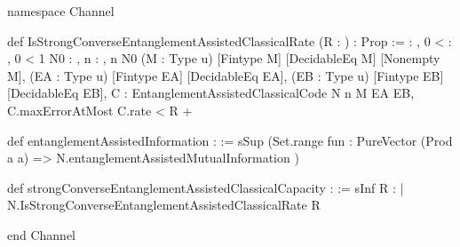 \documentclass[10pt,a4paper]{article}
\newif\ifqitLineFocused
\newcommand{\qitHighlightSpan}[2]{%
	\ifnum\value{lstnumber}<#1\relax
	\else
		\ifnum\value{lstnumber}>#2\relax
		\else
			\qitLineFocusedtrue
		\fi
	\fi
}
\begin{document}
\begin{qitleancode}[title={EA information and strong converse},
qit focus={\qitHighlightSpan{4}{5}\qitHighlightSpan{9}{10}\qitHighlightSpan{16}{17}}]
namespace Channel

def IsStrongConverseEntanglementAssistedClassicalRate (R : \mathbbR) : Prop :=
  \forall \delta : \mathbbR, 0 < \delta \to \forall \epsilon : \mathbbR, 0 \le \epsilon \to \epsilon < 1 \to
    \exists N0 : \mathbbN, \forall n : \mathbbN, n \ge N0 \to
      \forall (M : Type u) [Fintype M] [DecidableEq M] [Nonempty M],
        \forall (EA : Type u) [Fintype EA] [DecidableEq EA],
          \forall (EB : Type u) [Fintype EB] [DecidableEq EB],
            \forall C : EntanglementAssistedClassicalCode N n M EA EB,
              C.maxErrorAtMost \epsilon \to C.rate < R + \delta

def entanglementAssistedInformation : \mathbbR :=
  sSup (Set.range fun \psi : PureVector (Prod a a) =>
    N.entanglementAssistedMutualInformation \psi)

def strongConverseEntanglementAssistedClassicalCapacity : \mathbbR :=
  sInf {R : \mathbbR | N.IsStrongConverseEntanglementAssistedClassicalRate R}

end Channel
\end{qitleancode}
	
\end{document}
